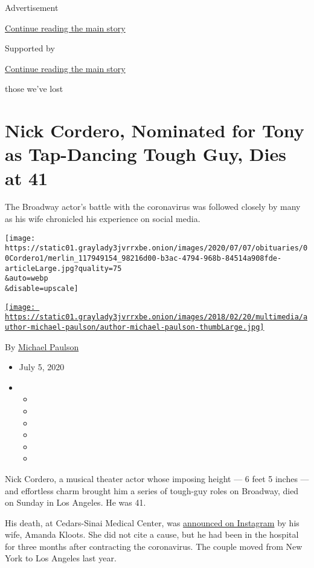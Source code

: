 Advertisement

\protect\hyperlink{after-top}{Continue reading the main story}

Supported by

\protect\hyperlink{after-sponsor}{Continue reading the main story}

those we've lost

\hypertarget{nick-cordero-nominated-for-tony-as-tap-dancing-tough-guy-dies-at-41}{%
\section{Nick Cordero, Nominated for Tony as Tap-Dancing Tough Guy, Dies
at
41}\label{nick-cordero-nominated-for-tony-as-tap-dancing-tough-guy-dies-at-41}}

The Broadway actor's battle with the coronavirus was followed closely by
many as his wife chronicled his experience on social media.

\texttt{[image: https://static01.graylady3jvrrxbe.onion/images/2020/07/07/obituaries/00Cordero1/merlin\_117949154\_98216d00-b3ac-4794-968b-84514a908fde-articleLarge.jpg?quality=75\\\&auto=webp\\\&disable=upscale]}

\href{https://www.nytimes3xbfgragh.onion/by/michael-paulson}{\texttt{[image: https://static01.graylady3jvrrxbe.onion/images/2018/02/20/multimedia/author-michael-paulson/author-michael-paulson-thumbLarge.jpg]}}

By \href{https://www.nytimes3xbfgragh.onion/by/michael-paulson}{Michael
Paulson}

\begin{itemize}
\item
  July 5, 2020
\item
  \begin{itemize}
  \item
  \item
  \item
  \item
  \item
  \item
  \end{itemize}
\end{itemize}

Nick Cordero, a musical theater actor whose imposing height --- 6 feet 5
inches --- and effortless charm brought him a series of tough-guy roles
on Broadway, died on Sunday in Los Angeles. He was 41.

His death, at Cedars-Sinai Medical Center, was
\href{https://www.instagram.com/p/CCSBM89Axt_/}{announced on Instagram}
by his wife, Amanda Kloots. She did not cite a cause, but he had been in
the hospital for three months after contracting the coronavirus. The
couple moved from New York to Los Angeles last year.

